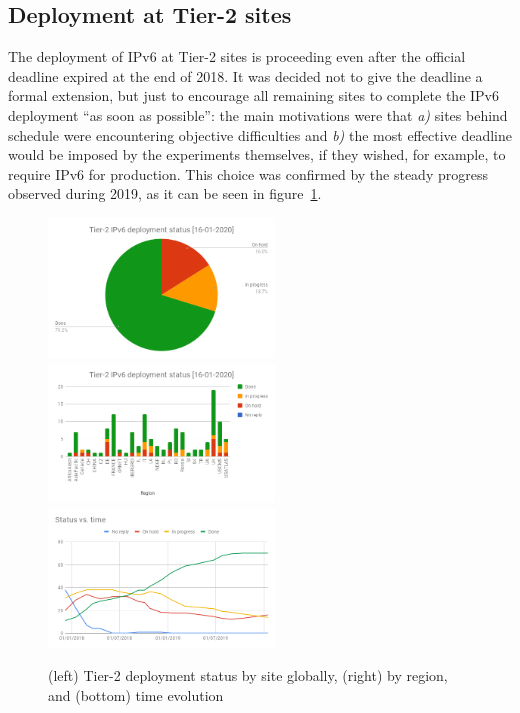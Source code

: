 \subsection{Deployment at Tier-2 sites}
The deployment of IPv6 at Tier-2 sites is proceeding even after the
official deadline expired at the end of 2018. It was decided not to
give the deadline a formal extension, but just to encourage all
remaining sites to complete the IPv6 deployment ``as soon as
possible'': the main motivations were that \emph{a)} sites behind
schedule were encountering objective difficulties and \emph{b)} the
most effective deadline would be imposed by the experiments
themselves, if they wished, for example, to require IPv6 for
production. This choice was confirmed by the steady progress observed
during 2019, as it can be seen in figure~\ref{fig:t2depl}.
\begin{figure}[b]
\centering
\includegraphics[width=6cm]{chart2}
\includegraphics[width=6cm]{chart}
\includegraphics[width=6cm]{chart3}
\caption{(left) Tier-2 deployment status by site globally, (right) by region, and (bottom) time evolution}
\label{fig:t2depl}
\end{figure}

